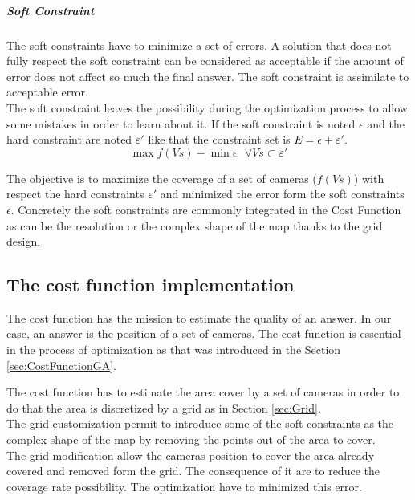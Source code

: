 \subparagraph{Soft Constraint} 
 The soft constraints have to minimize a set of errors. 
A solution that does not fully respect the soft constraint can be considered as acceptable if the
 amount of error does not affect so much the final answer. The soft constraint is assimilate to acceptable error. \\
 The soft constraint leaves the possibility during the optimization process to allow some mistakes in order to learn about it.  
 If the soft constraint is noted $\epsilon$ and the hard constraint are noted $ \varepsilon '$ like that the constraint set is $E=\epsilon+\varepsilon'$.\\
 
  \begin{equation}\label{eq:constraintEpsilon}
 	\max f(Vs) - \min \epsilon  \mbox{  } \forall Vs \subset \varepsilon'
 \end{equation}
 
The objective is to maximize the coverage of a set of cameras ($f(Vs)$) with respect the hard constraints $\varepsilon'$ and minimized the error form the soft constraints $\epsilon$.
Concretely the soft constraints are commonly integrated in the Cost Function as can be the resolution or  the  complex shape of the map thanks to the grid design. 


\subsection{The cost function implementation} \label{sec:costFun}

The cost function has the mission to estimate the quality of an answer. In our case, an answer is the position  of a set of cameras. The cost function is essential in the process of optimization as that was introduced in the Section \ref{sec:CostFunctionGA}.

The cost function has to estimate the area cover by a set of cameras in order to do that the area is discretized by a grid as in Section \ref{sec:Grid}. \\
The grid customization permit to introduce some of the soft constraints as the complex shape of the map by removing the points out of the area to cover.  \\
The grid modification  allow the cameras position to cover the area already covered and removed form the grid. The consequence of it are to reduce the coverage rate possibility. The optimization have to minimized this error.


